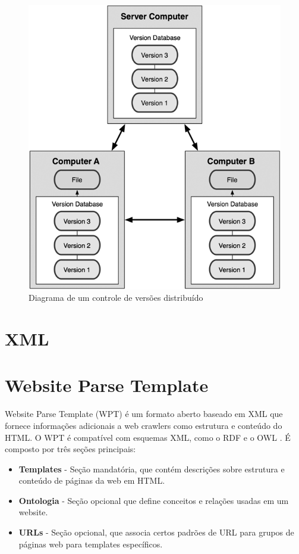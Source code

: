 \begin{figure} [ht]
	\centering
	\includegraphics[scale=0.4]{dist_version_control.png}
	\caption{Diagrama de um controle de versões distribuído \cite[p. 4]{progit}}
	\label{dist_version_control}
\end{figure}


\pagebreak


\section{XML}


\pagebreak


\section{Website Parse Template}


Website Parse Template (WPT) é um formato aberto baseado em XML que fornece informações adicionais a web crawlers como estrutura e conteúdo do HTML. O WPT é compatível com esquemas XML, como o RDF e o OWL \cite{wpt}. É composto por três seções principais:

\begin{itemize}
	\item \textbf{Templates} - Seção mandatória, que contém descrições sobre estrutura e conteúdo de páginas da web em HTML.
	\item \textbf{Ontologia} - Seção opcional que define conceitos e relações usadas em um website.
	\item \textbf{URLs} - Seção opcional, que associa certos padrões de URL para grupos de páginas web para templates específicos. 
\end{itemize}

